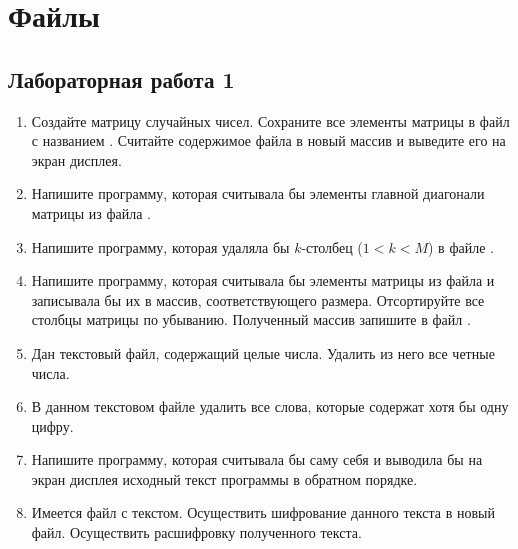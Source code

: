\chapter{Файлы}
\section{Лабораторная работа 1}
\begin{enumerate}[leftmargin=*]
    \item Создайте матрицу  случайных чисел. Сохраните все элементы матрицы в файл с названием . Считайте содержимое файла  в новый массив  и выведите его на экран дисплея.
    \item Напишите программу, которая считывала бы элементы главной диагонали матрицы из файла .
    \item Напишите программу, которая удаляла бы $k$-столбец ($1<k<M$) в файле .
    \item Напишите программу, которая считывала бы элементы матрицы из файла  и записывала бы их в массив, соответствующего размера. Отсортируйте все столбцы матрицы по убыванию. Полученный массив запишите в файл .
    \item Дан текстовый файл, содержащий целые числа. Удалить из него все четные числа. 
    \item В данном текстовом файле удалить все слова, которые содержат хотя бы одну цифру. 
    \item Напишите программу, которая считывала бы саму себя и выводила бы на экран дисплея исходный текст программы в обратном порядке.
    \item Имеется файл с текстом. Осуществить шифрование данного текста в новый файл. Осуществить расшифровку полученного текста.
\end{enumerate}